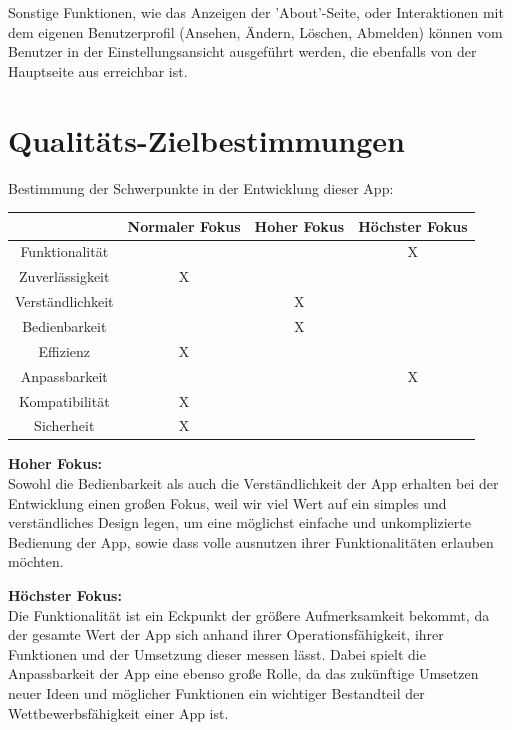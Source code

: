 \documentclass[parskip=full]{scrartcl}
\begin{document}
Sonstige Funktionen, wie das Anzeigen der 'About'-Seite, oder Interaktionen mit dem eigenen Benutzerprofil (Ansehen, Ändern, Löschen, Abmelden) können vom Benutzer in der Einstellungsansicht ausgeführt werden, die ebenfalls von der Hauptseite aus erreichbar ist.

\newpage
\section{Qualitäts-Zielbestimmungen}
Bestimmung der Schwerpunkte in der Entwicklung dieser App:

\begin{table}[!h]
	\begin{center}
		\begin{tabular}{|c||c|c|c|}
			\hline  & Normaler Fokus & Hoher Fokus & Höchster Fokus\\
			\hline  Funktionalität & & & X \\
			\hline  Zuverlässigkeit & X & &\\
			\hline  Verständlichkeit & & X & \\
			\hline  Bedienbarkeit & & X &\\
			\hline  Effizienz & X & & \\
			\hline  Anpassbarkeit & & & X \\
			\hline  Kompatibilität & X & &\\
			\hline  Sicherheit & X & &\\
			\hline
		\end{tabular}
	\end{center}
\end{table}

\textbf{Hoher Fokus:}\\ Sowohl die Bedienbarkeit als auch die Verständlichkeit der App erhalten bei der Entwicklung einen großen Fokus, weil wir viel Wert auf ein simples und verständliches Design legen, um eine möglichst einfache und unkomplizierte Bedienung der App, sowie dass volle ausnutzen ihrer Funktionalitäten erlauben möchten.
	
\textbf{Höchster Fokus:}\\ Die Funktionalität ist ein Eckpunkt der größere Aufmerksamkeit bekommt, da der gesamte Wert der App sich anhand ihrer Operationsfähigkeit, ihrer Funktionen und der Umsetzung dieser messen lässt. Dabei spielt die Anpassbarkeit der App eine ebenso große Rolle, da das zukünftige Umsetzen neuer Ideen und möglicher Funktionen ein wichtiger Bestandteil der Wettbewerbsfähigkeit einer App ist.
\end{document}
